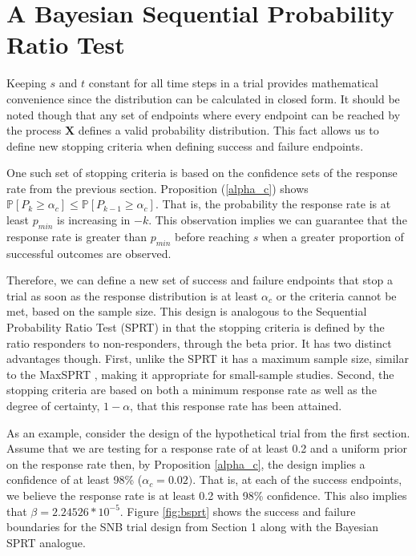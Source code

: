 \documentclass[12pt]{article}
\begin{document}
\section{A Bayesian Sequential Probability Ratio Test}

Keeping $s$ and $t$ constant for all time steps in a trial provides 
mathematical convenience since the distribution can be calculated in closed 
form. It should be noted though that any set of endpoints where every endpoint 
can be reached by the process $\mathbf X$ defines a valid probability 
distribution. This fact allows us 
to define new stopping criteria when defining success and failure endpoints.

One such set of stopping criteria is based on the confidence sets of the 
response rate from the previous section. Proposition (\ref{alpha_c}) shows 
$\mathbb{P} [P_k \geq \alpha_c] \leq \mathbb{P}[P_{k-1} \geq \alpha_c]$. 
That is, the probability the response rate is at least $p_{min}$ is increasing 
in $-k$. This observation implies we can guarantee that the response rate is 
greater than $p_{min}$ before reaching $s$ when a greater proportion of 
successful outcomes are observed.

Therefore, we can define a new set of success and failure endpoints that stop 
a trial as soon as the response distribution is at least $\alpha_c$ or the 
criteria cannot be met, based on the sample size. This design is analogous to 
the Sequential Probability Ratio Test (SPRT) \cite{Wald1945} in that the 
stopping criteria is defined by the ratio responders to non-responders, 
through the beta prior. It has two distinct advantages though. First, unlike 
the SPRT it has a maximum sample size, similar to the MaxSPRT 
\cite{Kulldorff2011}, making it appropriate for small-sample studies. Second, 
the stopping criteria are based on both a minimum response rate as well as the 
degree of certainty, $1-\alpha$, that this response rate has been attained.

As an example, consider the design of the hypothetical trial from the
first section. Assume that we are testing for a response rate of at least
0.2 and a uniform prior on the response rate then, by Proposition 
\ref{alpha_c}, the design implies a confidence of at least 98\% 
($\alpha_c = 0.02)$. That is, at each of the success endpoints, 
we believe the response rate is at least 0.2 with 98\% confidence. This also 
implies that $\beta = 2.24526 * 10^{-5}$.
Figure \ref{fig:bsprt} shows the success and failure boundaries for the 
SNB trial design from Section 1 along with the Bayesian SPRT analogue.
\end{document}
